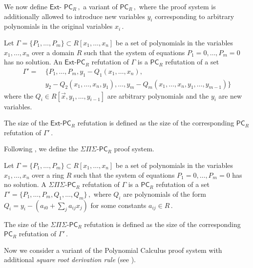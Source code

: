 \documentclass{toc}
\begin{document}
We now define
%
$\mathsf{Ext}$-%
$\mathsf{PC}_{R}\,,$ %
 a variant of %
$\mathsf{PC}_{R}\,,$ %
%
where the proof system is additionally allowed to introduce new variables $y_i$ corresponding to arbitrary polynomials in the original variables %
$x_i\,.$ %


\begin{definition}\label{def:Depth-inf-PC}
Let $\Gamma = \{P_1, \ldots, P_m\} \subset R[x_1, \ldots, x_n]$ be a set of polynomials in the variables %
$x_1, \ldots, x_n$ %
 over a domain $R$ such that the system of equations $P_1 = 0, \ldots, P_m = 0$ has no solution. An $\mathsf{Ext}$-$\mathsf{PC}_{R}$ refutation of $\Gamma$ is a $\mathsf{PC}_{R}$ refutation of a set
%
%
%
%
%
\begin{align*}
\Gamma' =& \ \{P_1, \ldots, P_m, y_1 - Q_1(x_1, \ldots, x_n),\\
& \ y_2 - Q_2(x_1, \ldots, x_n, y_1), \ldots,
  y_m - Q_m(x_1, \ldots, x_n, y_1, \ldots, y_{m - 1})\}
\end{align*}   %
where
the  %
$Q_i \in R[\vec{x}, y_1, \ldots, y_{i - 1}]$ are arbitrary polynomials and the $y_i$ are new variables. 

The size of the $\mathsf{Ext}$-$\mathsf{PC}_{R}$ refutation is defined as the size of the corresponding $\mathsf{PC}_{R}$ refutation of %
$\Gamma'\,.$ %
\end{definition}

Following \cite{IMP19_new}, we define the $\Sigma \Pi \Sigma$-$\mathsf{PC}_R$ proof system.

\begin{definition}\label{def:SPS-PC}
Let $\Gamma = \{P_1, \ldots, P_m\} \subset R[x_1, \ldots, x_n]$ be a set of polynomials in the variables %
$x_1, \ldots, x_n$ %
 over a ring $R$ such that the system of equations $P_1 = 0, \ldots, P_m = 0$ has no solution. A $\Sigma \Pi \Sigma$-$\mathsf{PC}_R$ refutation of $\Gamma$ is a $\mathsf{PC}_{R}$ refutation of a set %
$\Gamma' = \{P_1, \ldots, P_m, Q_1, \ldots, Q_m\}\,,$ %
 where $Q_i$ are polynomials of the form $Q_i = y_i - (a_{i 0} + \sum_j a_{i j} x_j)$ for some constants %
$a_{i j} \in R\,.$ %

The size of the $\Sigma \Pi \Sigma$-$\mathsf{PC}_R$ refutation is defined as the size of the corresponding $\mathsf{PC}_{R}$ refutation of %
$\Gamma'\,.$ %
\end{definition}

Now we consider a variant of
the  %
Polynomial Calculus proof system with additional \emph{square root derivation rule} (see \cite{GH03}). %
%
\end{document}
